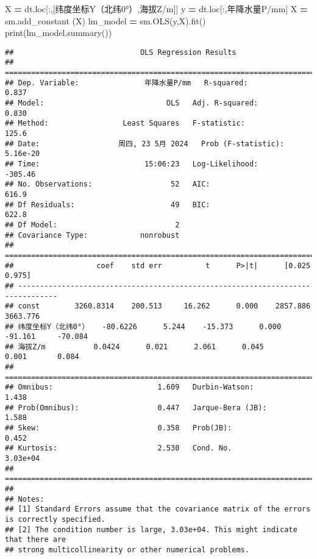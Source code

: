 \documentclass[
]{article}
\newenvironment{Shaded}{\begin{snugshade}}{\end{snugshade}}
\newcommand{\BuiltInTok}[1]{#1}
\newcommand{\NormalTok}[1]{#1}
\newcommand{\OperatorTok}[1]{\textcolor[rgb]{0.81,0.36,0.00}{\textbf{#1}}}
\newcommand{\StringTok}[1]{\textcolor[rgb]{0.31,0.60,0.02}{#1}}
\begin{document}
\begin{Shaded}
\begin{Highlighting}[]
\NormalTok{X }\OperatorTok{=}\NormalTok{ dt.loc[:,[}\StringTok{\textquotesingle{}纬度坐标Y（北纬0°）\textquotesingle{}}\NormalTok{,}\StringTok{\textquotesingle{}海拔Z/m\textquotesingle{}}\NormalTok{]]}
\NormalTok{y }\OperatorTok{=}\NormalTok{ dt.loc[:,}\StringTok{\textquotesingle{}年降水量P/mm\textquotesingle{}}\NormalTok{]}
\NormalTok{X }\OperatorTok{=}\NormalTok{ sm.add\_constant (X)}
\NormalTok{lm\_model }\OperatorTok{=}\NormalTok{ sm.OLS(y,X).fit()}
\BuiltInTok{print}\NormalTok{(lm\_model.summary())}
\end{Highlighting}
\end{Shaded}

\begin{verbatim}
##                             OLS Regression Results                            
## ==============================================================================
## Dep. Variable:               年降水量P/mm   R-squared:                       0.837
## Model:                            OLS   Adj. R-squared:                  0.830
## Method:                 Least Squares   F-statistic:                     125.6
## Date:                  周四, 23 5月 2024   Prob (F-statistic):           5.16e-20
## Time:                        15:06:23   Log-Likelihood:                -305.46
## No. Observations:                  52   AIC:                             616.9
## Df Residuals:                      49   BIC:                             622.8
## Df Model:                           2                                         
## Covariance Type:            nonrobust                                         
## ===============================================================================
##                   coef    std err          t      P>|t|      [0.025      0.975]
## -------------------------------------------------------------------------------
## const        3260.8314    200.513     16.262      0.000    2857.886    3663.776
## 纬度坐标Y（北纬0°）   -80.6226      5.244    -15.373      0.000     -91.161     -70.084
## 海拔Z/m           0.0424      0.021      2.061      0.045       0.001       0.084
## ==============================================================================
## Omnibus:                        1.609   Durbin-Watson:                   1.438
## Prob(Omnibus):                  0.447   Jarque-Bera (JB):                1.588
## Skew:                           0.358   Prob(JB):                        0.452
## Kurtosis:                       2.530   Cond. No.                     3.03e+04
## ==============================================================================
## 
## Notes:
## [1] Standard Errors assume that the covariance matrix of the errors is correctly specified.
## [2] The condition number is large, 3.03e+04. This might indicate that there are
## strong multicollinearity or other numerical problems.
\end{verbatim}
\end{document}
